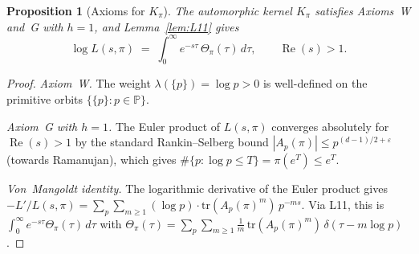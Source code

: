 \documentclass[12pt,a4paper]{article}
\newtheorem{proposition}[theorem]{Proposition}
\theoremstyle{remark}
\begin{document}
\begin{proposition}[Axioms for $K_\pi$]\label{prop:arithpi}
The automorphic kernel $K_\pi$ satisfies Axioms~\textup{W} and~\textup{G}
with $h=1$, and Lemma~\ref{lem:L11} gives
\[
  \log L(s,\pi)
  \;=\; \int_0^\infty e^{-s\tau}\,\Theta_\pi(\tau)\,d\tau,
  \qquad \operatorname{Re}(s)>1.
\]
\end{proposition}
\begin{proof}
\emph{Axiom~W.}
The weight $\lambda(\{p\})=\log p>0$ is well-defined on the primitive
orbits $\{\{p\}:p\in\mathbb{P}\}$.

\emph{Axiom~G with $h=1$.}
The Euler product of $L(s,\pi)$ converges absolutely for
$\operatorname{Re}(s)>1$ by the standard Rankin--Selberg bound
$|A_p(\pi)|\le p^{(d-1)/2+\varepsilon}$ (towards Ramanujan),
which gives $\#\{p:\log p\le T\}=\pi(e^T)\le e^T$.

\emph{Von~Mangoldt identity.}
The logarithmic derivative of the Euler product gives
$-L'/L(s,\pi)=\sum_p \sum_{m\ge1}(\log p)\cdot\mathrm{tr}(A_p(\pi)^m)\,p^{-ms}$.
Via L11, this is $\int_0^\infty e^{-s\tau}\Theta_\pi(\tau)\,d\tau$
with $\Theta_\pi(\tau)=\sum_p\sum_{m\ge1}\frac{1}{m}\,
\mathrm{tr}(A_p(\pi)^m)\,\delta(\tau-m\log p)$.
\end{proof}

\end{document}
